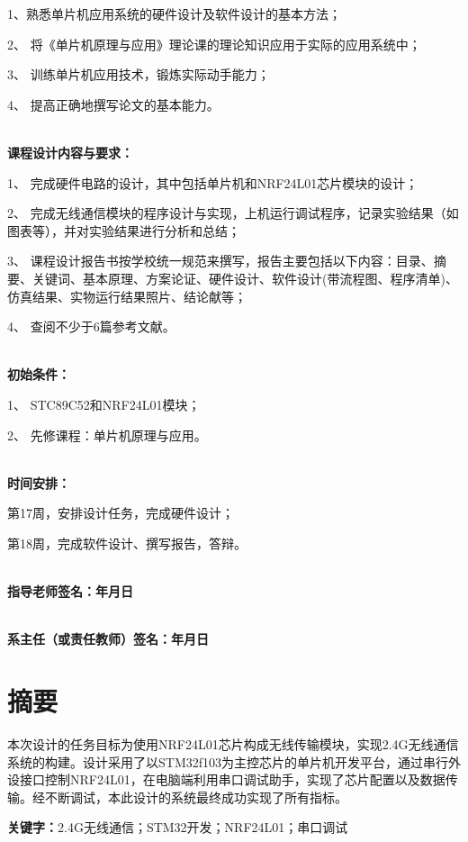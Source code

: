\documentclass[UTF8,a4paper,11pt]{article}
\begin{document}
1、熟悉单片机应用系统的硬件设计及软件设计的基本方法；

2、	将《单片机原理与应用》理论课的理论知识应用于实际的应用系统中；

3、	训练单片机应用技术，锻炼实际动手能力；

4、	提高正确地撰写论文的基本能力。

~\\
\large{\textbf{课程设计内容与要求：}}\normalsize

1、	完成硬件电路的设计，其中包括单片机和NRF24L01芯片模块的设计；
 
2、	完成无线通信模块的程序设计与实现，上机运行调试程序，记录实验结果（如图表等），并对实验结果进行分析和总结； 

3、	 课程设计报告书按学校统一规范来撰写，报告主要包括以下内容：目录、摘要、关键词、基本原理、方案论证、硬件设计、软件设计(带流程图、程序清单)、仿真结果、实物运行结果照片、结论献等；

4、	查阅不少于6篇参考文献。

~\\
\large{\textbf{初始条件：}}\normalsize

1、	STC89C52和NRF24L01模块； 

2、	先修课程：单片机原理与应用。

~\\
\large{\textbf{时间安排：}}\normalsize

第17周，安排设计任务，完成硬件设计；

第18周，完成软件设计、撰写报告，答辩。

~\\
\large\textbf{指导老师签名：\hfill 年\quad\quad 月\quad\quad 日}

~\\
\large\textbf{系主任（或责任教师）签名：\hfill 年\quad\quad 月\quad\quad 日}\normalsize
\thispagestyle{empty}
\clearpage

\tableofcontents
\thispagestyle{empty}
\clearpage

\setcounter{page}{1}
\section*{摘要}
本次设计的任务目标为使用NRF24L01芯片构成无线传输模块，实现2.4G无线通信系统的构建。设计采用了以STM32f103为主控芯片的单片机开发平台，通过串行外设接口控制NRF24L01，在电脑端利用串口调试助手，实现了芯片配置以及数据传输。经不断调试，本此设计的系统最终成功实现了所有指标。

{\large\textbf{关键字：}}2.4G无线通信；STM32开发；NRF24L01；串口调试
\clearpage
\end{document}
